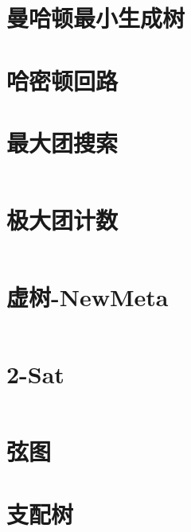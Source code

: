 \section{曼哈顿最小生成树}

\section{哈密顿回路}

\section{最大团搜索}
\inputminted{cpp}{./graph-theory/maximum-clique.cpp}
\section{极大团计数}
\inputminted{cpp}{./graph-theory/maximum-clique-counting.cpp}
\section{虚树-NewMeta}
\inputminted{cpp}{./graph-theory/virtual-tree-NewMeta.cpp}
\section{2-Sat}
\inputminted{cpp}{./graph-theory/2-sat.cpp}
\section{弦图}

\section{支配树}
\inputminted{cpp}{./graph-theory/dominator-tree.cpp}